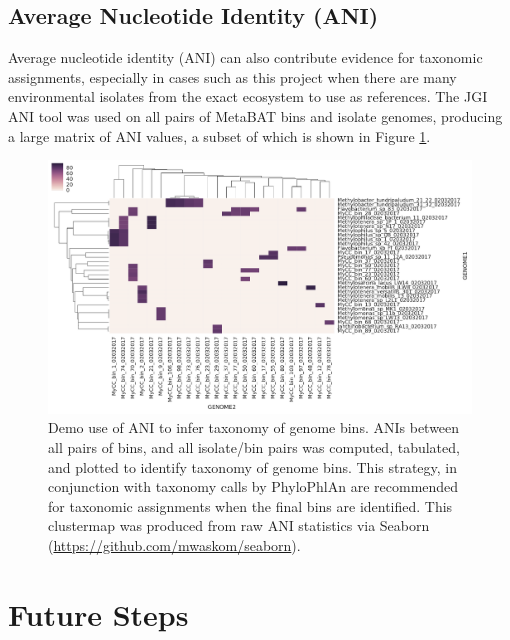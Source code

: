 \subsection{Average Nucleotide Identity (ANI)}

Average nucleotide identity (ANI) can also contribute evidence for taxonomic assignments, especially in cases such as this project when there are many environmental isolates from the exact ecosystem to use as references.
The JGI ANI tool was used on all pairs of MetaBAT bins and isolate genomes, producing a large matrix of ANI values, a subset of which is shown in Figure \ref{fig:ANIs}.

\begin{figure}[H]
\centering
    \includegraphics[width=1.0\textwidth]{./tex/chapter2/figures/170203_demo_of_ANI_heatmap.pdf}
    \begin{singlespace}
    \caption[Demo use of ANI to infer taxonomy of genome bins]{
        Demo use of ANI to infer taxonomy of genome bins.
        ANIs between all pairs of bins, and all isolate/bin pairs was computed, tabulated, and plotted to identify taxonomy of genome bins.
        This strategy, in conjunction with taxonomy calls by PhyloPhlAn \cite{segata2013} are recommended for taxonomic assignments when the final bins are identified.
        This clustermap was produced from raw ANI statistics via Seaborn (\url{https://github.com/mwaskom/seaborn}).}
    \label{fig:ANIs}
    \end{singlespace}
\end{figure}

\section{Future Steps}
\label{chA_future_steps}


